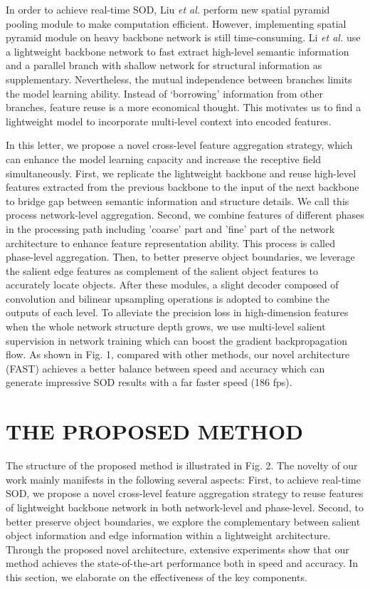 \documentclass[journal]{IEEEtran}
\begin{document}
In order to achieve real-time SOD, Liu {\em et al.} \cite{DBLP:conf/cvpr/LiuHCFJ19} perform new spatial pyramid pooling module to make computation efficient. However, implementing spatial pyramid module on heavy backbone network is still time-consuming. Li {\em et al.} \cite{DBLP:conf/icassp/LiSTH19} use a lightweight backbone network to fast extract high-level semantic information and a parallel branch with shallow network for structural information as supplementary. Nevertheless, the mutual independence between branches limits the model learning ability. Instead of ‘borrowing’ information from other branches, feature reuse is a more economical thought. This motivates us to find a lightweight model to incorporate multi-level context into encoded features.

In this letter, we propose a novel cross-level feature aggregation strategy, which can enhance the model learning capacity and increase the receptive field simultaneously. 
First, we replicate the lightweight backbone \cite{DBLP:conf/cvpr/Chollet17} and reuse high-level features extracted from the previous backbone to the input of the next backbone to bridge gap between semantic information and structure details. We call this process network-level aggregation. 
Second, we combine features of different phases in the processing path including 'coarse' part and 'fine' part of the network architecture to enhance feature representation ability. This process is called phase-level aggregation.
Then, to better preserve object boundaries, we leverage the salient edge features as complement of the salient object features to accurately locate objects. After these modules, a slight decoder composed of convolution and bilinear upsampling operations is adopted to combine the outputs of each level. To alleviate the precision loss in high-dimension features when the whole network structure depth grows, we use multi-level salient supervision in network training which can boost the gradient backpropagation flow. As shown in Fig. 1, compared with other methods, our novel architecture (FAST) achieves a better balance between speed and accuracy which can generate impressive SOD results with a far faster speed (186 fps).


\section{THE PROPOSED METHOD}
The structure of the proposed method is illustrated in Fig. 2. The novelty of our work mainly manifests in the following several aspects: 
First, to achieve real-time SOD, we propose a novel cross-level feature aggregation strategy to reuse features of lightweight backbone network in both network-level and phase-level. Second, to better preserve object boundaries, we explore the complementary between salient object information and edge information within a lightweight architecture. Through the proposed  novel architecture, extensive experiments show that our method achieves the state-of-the-art performance both in speed and accuracy. In this section, we elaborate on the effectiveness of the key components.
\end{document}
